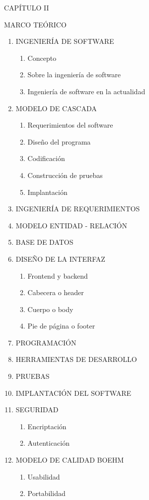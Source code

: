 \documentclass[12pt,letterpaper]{article}
\begin{document}
\noindent CAPÍTULO II

\noindent MARCO TEÓRICO

\begin{enumerate}[nosep, label=2.\arabic*., left = 0pt .. \parindent]
    \item INGENIERÍA DE SOFTWARE
    \begin{enumerate}[nosep, label=2.\arabic{enumi}.\arabic*., left = 0pt .. \parindent]
    	\item Concepto
        \item Sobre la ingeniería de software
        \item Ingeniería de software en la actualidad
    \end{enumerate}
    \item MODELO DE CASCADA
    \begin{enumerate}[nosep, label=2.\arabic{enumi}.\arabic*., left = 0pt .. \parindent]
    	\item Requerimientos del software
        \item Diseño del programa
        \item Codificación
        \item Construcción de pruebas
        \item Implantación
    \end{enumerate}
    \item INGENIERÍA DE REQUERIMIENTOS
    \item MODELO ENTIDAD - RELACIÓN
    \item BASE DE DATOS
    \item DISEÑO DE LA INTERFAZ
    \begin{enumerate}[nosep, label=2.\arabic{enumi}.\arabic*., left = 0pt .. \parindent]
    	\item Frontend y backend
        \item Cabecera o header
        \item Cuerpo o body
        \item Pie de página o footer
    \end{enumerate}
    \item PROGRAMACIÓN
    \item HERRAMIENTAS DE DESARROLLO
    \item PRUEBAS
    \item IMPLANTACIÓN DEL SOFTWARE
    \item SEGURIDAD
    \begin{enumerate}[nosep, label=2.\arabic{enumi}.\arabic*., left = 0pt .. \parindent]
    	\item Encriptación
        \item Autenticación
	\end{enumerate}
	\item MODELO DE CALIDAD BOEHM
	\begin{enumerate}[nosep, label=2.\arabic{enumi}.\arabic*., left = 0pt .. \parindent]
		\item Usabilidad
		\item Portabilidad
	\end{enumerate}
    
\end{enumerate}
\end{document}
